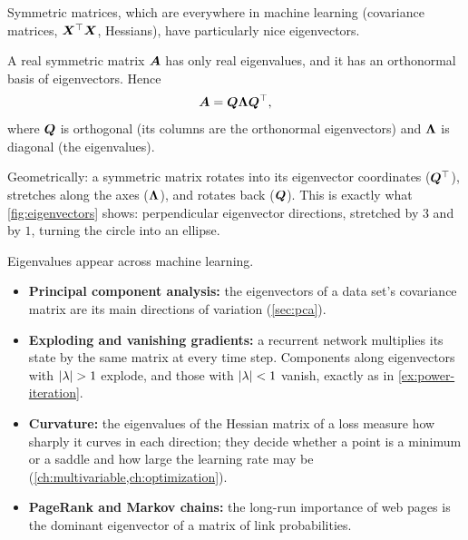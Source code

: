 Symmetric matrices, which are everywhere in machine learning (covariance
matrices, $\bm{X}^\top\bm{X}$, Hessians), have particularly nice eigenvectors.

\begin{theorem}\label{thm:spectral}
A real symmetric matrix $\bm{A}$ has only real eigenvalues, and it has an
orthonormal basis of eigenvectors. Hence
\[
  \bm{A} = \bm{Q}\bm{\Lambda}\bm{Q}^\top ,
\]
where $\bm{Q}$ is orthogonal (its columns are the orthonormal eigenvectors) and
$\bm{\Lambda}$ is diagonal (the eigenvalues).
\end{theorem}

Geometrically: a symmetric matrix rotates into its eigenvector coordinates
($\bm{Q}^\top$), stretches along the axes ($\bm{\Lambda}$), and rotates back ($\bm{Q}$).
This is exactly what \cref{fig:eigenvectors} shows: perpendicular eigenvector
directions, stretched by $3$ and by $1$, turning the circle into an ellipse.

\begin{mlnote}
Eigenvalues appear across machine learning.
\begin{itemize}
  \item \textbf{Principal component analysis:} the eigenvectors of a data set's
    covariance matrix are its main directions of variation
    (\cref{sec:pca}).
  \item \textbf{Exploding and vanishing gradients:} a recurrent network
    multiplies its state by the same matrix at every time step. Components along
    eigenvectors with $\lvert\lambda\rvert > 1$ explode, and those with
    $\lvert\lambda\rvert < 1$ vanish, exactly as in \cref{ex:power-iteration}.
  \item \textbf{Curvature:} the eigenvalues of the Hessian matrix of a loss
    measure how sharply it curves in each direction; they decide whether a
    point is a minimum or a saddle and how large the learning rate may be
    (\cref{ch:multivariable,ch:optimization}).
  \item \textbf{PageRank and Markov chains:} the long-run importance of web
    pages is the dominant eigenvector of a matrix of link probabilities.
\end{itemize}
\end{mlnote}

\sectionexercises

